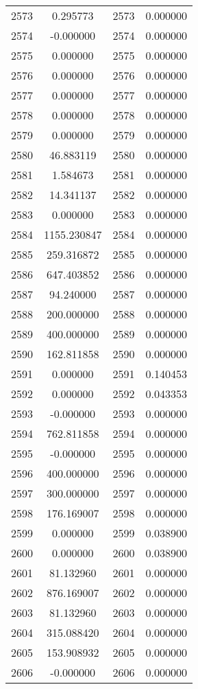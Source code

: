 \documentclass[12pt]{article}
\begin{document}
\begin{longtable}{@{}cccc@{}}
2573 & 0.295773 & 2573 & 0.000000 \\
2574 & -0.000000 & 2574 & 0.000000 \\
2575 & 0.000000 & 2575 & 0.000000 \\
2576 & 0.000000 & 2576 & 0.000000 \\
2577 & 0.000000 & 2577 & 0.000000 \\
2578 & 0.000000 & 2578 & 0.000000 \\
2579 & 0.000000 & 2579 & 0.000000 \\
2580 & 46.883119 & 2580 & 0.000000 \\
2581 & 1.584673 & 2581 & 0.000000 \\
2582 & 14.341137 & 2582 & 0.000000 \\
2583 & 0.000000 & 2583 & 0.000000 \\
2584 & 1155.230847 & 2584 & 0.000000 \\
2585 & 259.316872 & 2585 & 0.000000 \\
2586 & 647.403852 & 2586 & 0.000000 \\
2587 & 94.240000 & 2587 & 0.000000 \\
2588 & 200.000000 & 2588 & 0.000000 \\
2589 & 400.000000 & 2589 & 0.000000 \\
2590 & 162.811858 & 2590 & 0.000000 \\
2591 & 0.000000 & 2591 & 0.140453 \\
2592 & 0.000000 & 2592 & 0.043353 \\
2593 & -0.000000 & 2593 & 0.000000 \\
2594 & 762.811858 & 2594 & 0.000000 \\
2595 & -0.000000 & 2595 & 0.000000 \\
2596 & 400.000000 & 2596 & 0.000000 \\
2597 & 300.000000 & 2597 & 0.000000 \\
2598 & 176.169007 & 2598 & 0.000000 \\
2599 & 0.000000 & 2599 & 0.038900 \\
2600 & 0.000000 & 2600 & 0.038900 \\
2601 & 81.132960 & 2601 & 0.000000 \\
2602 & 876.169007 & 2602 & 0.000000 \\
2603 & 81.132960 & 2603 & 0.000000 \\
2604 & 315.088420 & 2604 & 0.000000 \\
2605 & 153.908932 & 2605 & 0.000000 \\
2606 & -0.000000 & 2606 & 0.000000 \\

\end{longtable}
\end{document}
